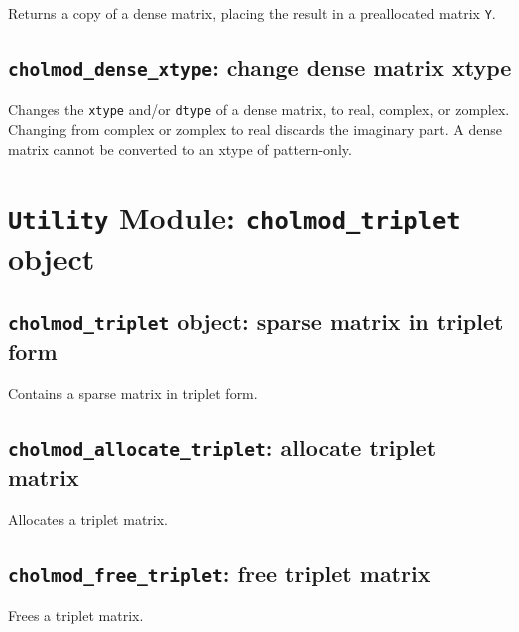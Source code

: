 \documentclass[11pt]{article}
\begin{document}

Returns a copy of a dense matrix, placing the result in a preallocated matrix
{\tt Y}.

\subsection{{\tt cholmod\_dense\_xtype}: change dense matrix xtype}


Changes the {\tt xtype} and/or {\tt dtype} of a dense matrix, to real, complex,
or zomplex.  Changing from complex or zomplex to real discards the imaginary
part.  A dense matrix cannot be converted to an xtype of pattern-only.

\newpage \section{{\tt Utility} Module: {\tt cholmod\_triplet} object}
\label{cholmod_triplet}

\subsection{{\tt cholmod\_triplet} object: sparse matrix in triplet form}


Contains a sparse matrix in triplet form.

\subsection{{\tt cholmod\_allocate\_triplet}: allocate triplet matrix}


Allocates a triplet matrix.

\subsection{{\tt cholmod\_free\_triplet}: free triplet matrix}


Frees a triplet matrix.
\end{document}
